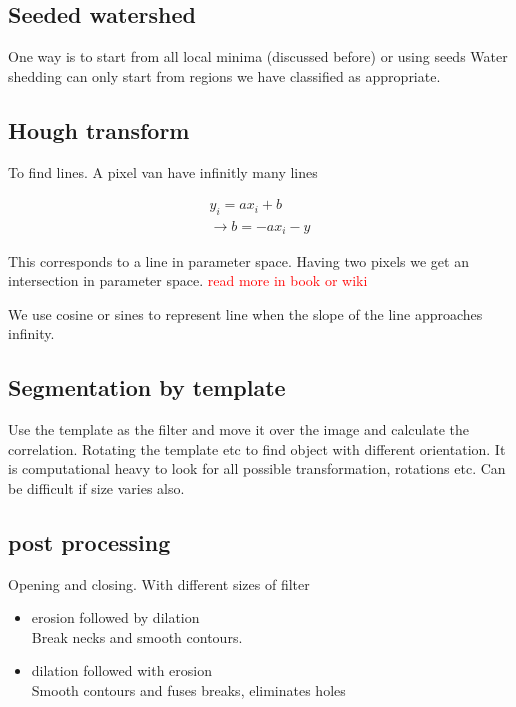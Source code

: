 \subsection*{Seeded watershed}
One way is to start from all local minima (discussed before) or using seeds Water shedding can only start from regions we have classified as appropriate. 


\subsection*{Hough transform}
To find lines. A pixel van have infinitly many lines 

\begin{equation}
\begin{aligned}
y_i = ax_i+b \\
\rightarrow b = -ax_i -y
\end{aligned}
\end{equation}

This corresponds to a line in parameter space. Having two pixels we get an intersection in parameter space. 
 \textcolor{red}{read more in book or wiki} 

We use cosine or sines to represent line when the slope of the line approaches infinity.

\subsection*{Segmentation by template}
Use the template as the filter and move it over the image and calculate the correlation. Rotating the template etc to find object with different orientation. It is computational heavy to look for all possible transformation, rotations etc. Can be difficult if size varies also.   


\subsection*{post processing}
Opening and closing. With different sizes of filter

\begin{itemize}
	\item erosion followed by dilation \\
	Break necks and smooth contours. 
	\item dilation followed with erosion \\
	Smooth contours and fuses breaks, eliminates holes

\end{itemize}


